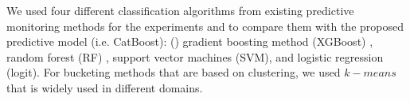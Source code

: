 



We used four different classification algorithms from existing predictive monitoring methods for the experiments and to compare them with the proposed predictive model (i.e. CatBoost): () gradient boosting method (XGBoost) \cite{rozumnyi2017dashboard, senderovich2019knowledge}, random forest (RF) \cite{leontjeva2016complex, cudredata}, support vector machines (SVM), and logistic regression (logit). For bucketing methods that are based on clustering, we used $k-means$ that is widely used in different domains. 

